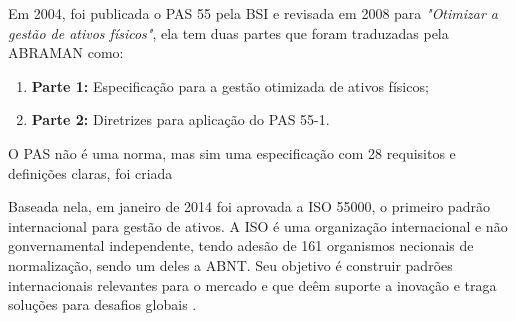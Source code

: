Em 2004, foi publicada o PAS 55 pela BSI e revisada em 2008 para \textit{"Otimizar a gestão de ativos físicos"}, ela tem duas partes que foram traduzadas pela ABRAMAN como:

\begin{enumerate}
	\item \textbf{Parte 1:} Especificação para a gestão otimizada de ativos físicos;
	\item \textbf{Parte 2:} Diretrizes para aplicação do PAS 55-1. 
\end{enumerate} 

O PAS não é uma norma, mas sim uma especificação com 28 requisitos e definições claras, foi criada  

Baseada nela, em janeiro de 2014 foi aprovada a ISO 55000, o primeiro padrão internacional para gestão de ativos. A ISO é uma organização internacional e não gonvernamental independente, tendo adesão de 161 organismos necionais de normalização, sendo um deles a ABNT. Seu objetivo é construir padrões internacionais relevantes para o mercado e que deêm suporte a inovação e traga soluções para desafios globais .




